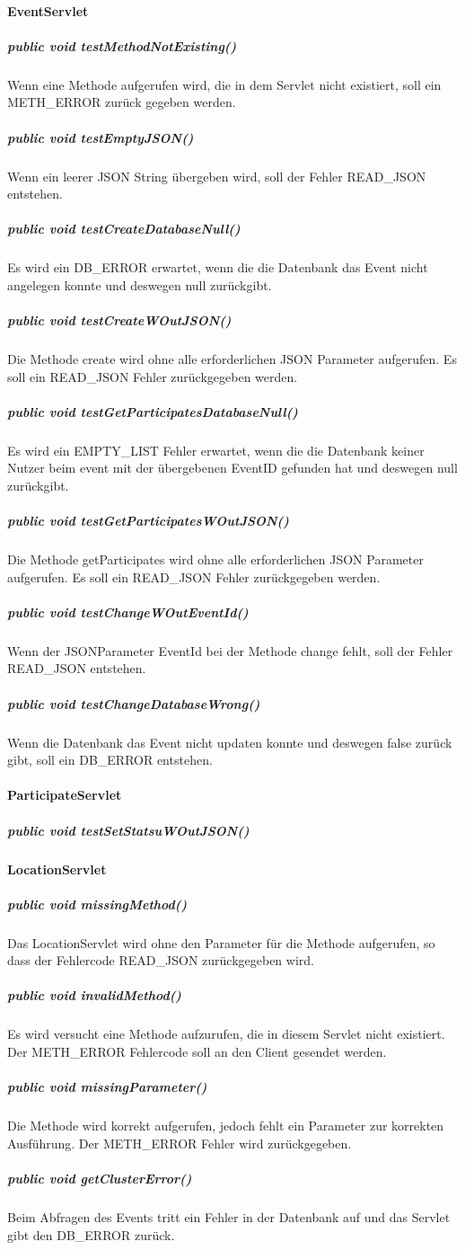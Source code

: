 \documentclass{scrartcl}
\begin{document}
\paragraph{EventServlet}
\subparagraph{public void testMethodNotExisting()}
Wenn eine Methode aufgerufen wird, die in dem Servlet nicht existiert, soll ein METH\_ERROR zurück gegeben werden.
\subparagraph{public void testEmptyJSON()}
Wenn ein leerer JSON String übergeben wird, soll der Fehler READ\_JSON entstehen.
\subparagraph{public void testCreateDatabaseNull()}
Es wird ein DB\_ERROR erwartet, wenn die die Datenbank das Event nicht angelegen konnte und deswegen null zurückgibt.
\subparagraph{public void testCreateWOutJSON()}
Die Methode create wird ohne alle erforderlichen JSON Parameter aufgerufen. Es soll ein READ\_JSON Fehler zurückgegeben werden.
\subparagraph{public void testGetParticipatesDatabaseNull()}
Es wird ein EMPTY\_LIST Fehler erwartet, wenn die die Datenbank keiner Nutzer beim event mit der übergebenen EventID gefunden hat und deswegen null zurückgibt.
\subparagraph{public void testGetParticipatesWOutJSON()}
Die Methode getParticipates wird ohne alle erforderlichen JSON Parameter aufgerufen. Es soll ein READ\_JSON Fehler zurückgegeben werden.
\subparagraph{public void testChangeWOutEventId()}
Wenn der JSONParameter EventId bei der Methode change fehlt, soll der Fehler READ\_JSON entstehen.
\subparagraph{public void testChangeDatabaseWrong()}
 Wenn die Datenbank das Event nicht updaten konnte und deswegen false zurück gibt, soll ein DB\_ERROR entstehen.
 
\paragraph{ParticipateServlet}
\subparagraph{public void testSetStatsuWOutJSON()}


\paragraph{LocationServlet}
\subparagraph{public void missingMethod()}
Das LocationServlet wird ohne den Parameter für die Methode aufgerufen, so dass der Fehlercode READ\_JSON zurückgegeben wird.
\subparagraph{public void invalidMethod()}
Es wird versucht eine Methode aufzurufen, die in diesem Servlet nicht existiert. Der METH\_ERROR Fehlercode soll an den Client gesendet werden.
\subparagraph{public void missingParameter()}
Die Methode wird korrekt aufgerufen, jedoch fehlt ein Parameter zur korrekten Ausführung. Der METH\_ERROR Fehler wird zurückgegeben.
\subparagraph{public void getClusterError()}
Beim Abfragen des Events tritt ein Fehler in der Datenbank auf und das Servlet gibt den DB\_ERROR zurück.
\end{document}

